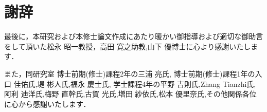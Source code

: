 \chapter*{謝辞}

最後に，本研究および本修士論文作成にあたり暖かい御指導および適切な御助言をして頂いた松永 昭一教授，高田 寛之助教,山下 優博士に心より感謝いたします．

また，同研究室
博士前期(修士)課程2年の三浦 亮氏,
博士前期(修士)課程1年の入口 佳佑氏,堤 彬人氏,福永 慶士氏,
学士課程4年の平野 吉則氏,Zhang Tianzhi氏,
阿利 迪洋氏,梅野 直幹氏,古賀 光氏,増田 紗依氏,松本 優里奈氏,その他関係各位に心から感謝いたします．
